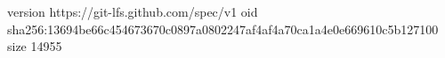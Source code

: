 version https://git-lfs.github.com/spec/v1
oid sha256:13694be66c454673670c0897a0802247af4af4a70ca1a4e0e669610c5b127100
size 14955
